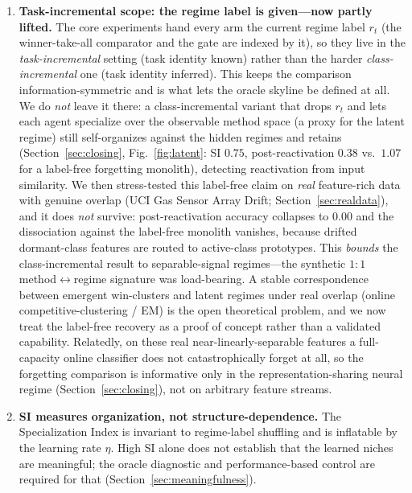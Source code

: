 \documentclass{article}
\begin{document}
\begin{enumerate}
    \item \textbf{Task-incremental scope: the regime label is given---now partly
    lifted.} The core experiments hand every arm the current regime label $r_t$ (the
    winner-take-all comparator and the gate are indexed by it), so they live in the
    \emph{task-incremental} setting (task identity known) rather than the harder
    \emph{class-incremental} one (task identity inferred). This keeps the comparison
    information-symmetric and is what lets the oracle skyline be defined at all. We do
    \emph{not} leave it there: a class-incremental variant that drops $r_t$ and lets
    each agent specialize over the observable method space (a proxy for the latent
    regime) still self-organizes against the hidden regimes and retains
    (Section~\ref{sec:closing}, Fig.~\ref{fig:latent}: SI $0.75$, post-reactivation
    $0.38$ vs.\ $1.07$ for a label-free forgetting monolith), detecting reactivation
    from input similarity. We then stress-tested this label-free claim on \emph{real}
    feature-rich data with genuine overlap (UCI Gas Sensor Array Drift;
    Section~\ref{sec:realdata}), and it does \emph{not} survive: post-reactivation
    accuracy collapses to $0.00$ and the dissociation against the label-free monolith
    vanishes, because drifted dormant-class features are routed to active-class
    prototypes. This \emph{bounds} the class-incremental result to separable-signal
    regimes---the synthetic $1{:}1$ method$\leftrightarrow$regime signature was
    load-bearing. A stable correspondence between emergent win-clusters and latent
    regimes under real overlap (online competitive-clustering / EM) is the open
    theoretical problem, and we now treat the label-free recovery as a proof of concept
    rather than a validated capability. Relatedly, on these real
    near-linearly-separable features a full-capacity online classifier does not
    catastrophically forget at all, so the forgetting comparison is informative only in
    the representation-sharing neural regime (Section~\ref{sec:closing}), not on
    arbitrary feature streams.

    \item \textbf{SI measures organization, not structure-dependence.} The
    Specialization Index is invariant to regime-label shuffling and is inflatable
    by the learning rate $\eta$. High SI alone does not establish that the
    learned niches are meaningful; the oracle diagnostic and performance-based
    control are required for that (Section~\ref{sec:meaningfulness}).


\end{enumerate}
\end{document}
